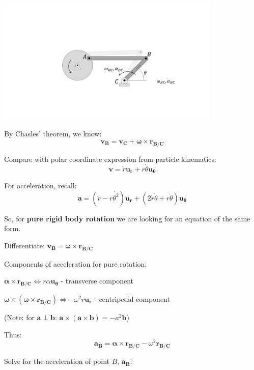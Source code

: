 \documentclass[12pt,letterpaper,twoside]{report}
\begin{document}
\includegraphics[trim={3cm 5cm 3cm 6cm},clip,width=0.8\textwidth, center]{Slide6}

By Chasles’ theorem, we know:
\[
\bm{v_B}= \bm{v_C} + \bm{\omega} \times \bm{r_{B/C}}\]
\raggedbottom
\newpage

\vspace*{5\baselineskip}

Compare with polar coordinate expression from particle kinematics: 
\[ \bm{v} = \dot{r}\bm{u_r} + r\dot{\theta}\bm{u_\theta}
\]

\vspace*{7\baselineskip}

For acceleration, recall:  
\[
\bm{a}=(\ddot{r}-r\dot{\theta^2})\bm{u_r}+(2\dot{r}\dot{\theta}+r\ddot{\theta})\bm{u_\theta}
\]

So, for \textbf{pure rigid body rotation} we are looking for an equation of the same form.

Differentiate: $ \bm{v_B}= \bm{\omega} \times \bm{r_{B/C}} $

\vspace*{14\baselineskip}

Components of acceleration for pure rotation:
\begin{center}
$\bm{\alpha} \times \bm{r_{B/C}} \Longleftrightarrow r\alpha\bm{u_\theta}$ - transverse component

$\bm{\omega} \times(\bm{\omega} \times \bm{r_{B/C}}) \Longleftrightarrow  -\omega^2r\bm{u_r}$ - centripedal component
\end{center}


(Note: for $\bm{a} \perp \bm{b}$: $\bm{a} \times(\bm{a}\times \bm{b}) = -a^2 \bm{b}$)


Thus: 
\[ \bm{a_B} = \bm{\alpha} \times \bm{r_{B/C}} - \omega^2 \bm{r_{B/C}} \]

Solve for the acceleration of point $B$, $\bm{a_B}$:
\vspace*{25\baselineskip}
\end{document}
